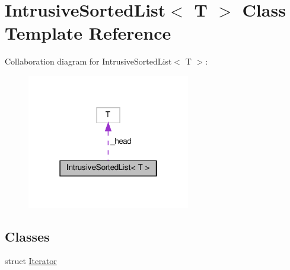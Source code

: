 \hypertarget{classIntrusiveSortedList}{}\section{Intrusive\+Sorted\+List$<$ T $>$ Class Template Reference}
\label{classIntrusiveSortedList}


Collaboration diagram for Intrusive\+Sorted\+List$<$ T $>$\+:\nopagebreak
\begin{figure}[H]
\begin{center}
\leavevmode
\includegraphics[width=202pt]{d3/da9/classIntrusiveSortedList__coll__graph}
\end{center}
\end{figure}
\subsection*{Classes}
\begin{DoxyCompactItemize}
\item 
struct \hyperlink{structIntrusiveSortedList_1_1Iterator}{Iterator}
\end{DoxyCompactItemize}
